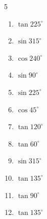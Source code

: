 \begin{multicols}{5}
\begin{enumerate}

  \item $\displaystyle \tan{225^\circ}$

        \phantom{$\displaystyle =1$}

  \item $\displaystyle \sin{315^\circ}$


  \item $\displaystyle \cos{240^\circ}$


  \item $\displaystyle \sin{90^\circ}$

        \phantom{$\displaystyle =1$}

  \item $\displaystyle \sin{225^\circ}$


  \item $\displaystyle \cos{45^\circ}$


\columnbreak %

  \item $\displaystyle \tan{120^\circ}$


  \item $\displaystyle \tan{60^\circ}$


  \item $\displaystyle \sin{315^\circ}$


  \item $\displaystyle \tan{135^\circ}$

        \phantom{$\displaystyle =-1$}

  \item $\displaystyle \tan{90^\circ}$

        \phantom{$\displaystyle なし$}

  \item $\displaystyle \tan{135^\circ}$

        \phantom{$\displaystyle =-1$}


\end{enumerate}
\end{multicols}
